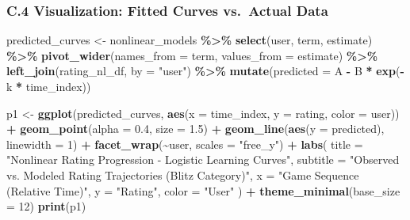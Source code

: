 \documentclass[
]{article}
\newenvironment{Shaded}{\begin{snugshade}}{\end{snugshade}}
\newcommand{\AttributeTok}[1]{\textcolor[rgb]{0.13,0.29,0.53}{#1}}
\newcommand{\DecValTok}[1]{\textcolor[rgb]{0.00,0.00,0.81}{#1}}
\newcommand{\FloatTok}[1]{\textcolor[rgb]{0.00,0.00,0.81}{#1}}
\newcommand{\FunctionTok}[1]{\textcolor[rgb]{0.13,0.29,0.53}{\textbf{#1}}}
\newcommand{\NormalTok}[1]{#1}
\newcommand{\OtherTok}[1]{\textcolor[rgb]{0.56,0.35,0.01}{#1}}
\newcommand{\SpecialCharTok}[1]{\textcolor[rgb]{0.81,0.36,0.00}{\textbf{#1}}}
\newcommand{\StringTok}[1]{\textcolor[rgb]{0.31,0.60,0.02}{#1}}
\begin{document}
\subsubsection{C.4 Visualization: Fitted Curves vs.~Actual
Data}\label{c.4-visualization-fitted-curves-vs.-actual-data}

\begin{Shaded}
\begin{Highlighting}[]
\NormalTok{predicted\_curves }\OtherTok{\textless{}{-}}\NormalTok{ nonlinear\_models }\SpecialCharTok{\%\textgreater{}\%}
  \FunctionTok{select}\NormalTok{(user, term, estimate) }\SpecialCharTok{\%\textgreater{}\%}
  \FunctionTok{pivot\_wider}\NormalTok{(}\AttributeTok{names\_from =}\NormalTok{ term, }\AttributeTok{values\_from =}\NormalTok{ estimate) }\SpecialCharTok{\%\textgreater{}\%}
  \FunctionTok{left\_join}\NormalTok{(rating\_nl\_df, }\AttributeTok{by =} \StringTok{"user"}\NormalTok{) }\SpecialCharTok{\%\textgreater{}\%}
  \FunctionTok{mutate}\NormalTok{(}\AttributeTok{predicted =}\NormalTok{ A }\SpecialCharTok{{-}}\NormalTok{ B }\SpecialCharTok{*} \FunctionTok{exp}\NormalTok{(}\SpecialCharTok{{-}}\NormalTok{k }\SpecialCharTok{*}\NormalTok{ time\_index))}

\NormalTok{p1 }\OtherTok{\textless{}{-}} \FunctionTok{ggplot}\NormalTok{(predicted\_curves, }\FunctionTok{aes}\NormalTok{(}\AttributeTok{x =}\NormalTok{ time\_index, }\AttributeTok{y =}\NormalTok{ rating, }\AttributeTok{color =}\NormalTok{ user)) }\SpecialCharTok{+}
  \FunctionTok{geom\_point}\NormalTok{(}\AttributeTok{alpha =} \FloatTok{0.4}\NormalTok{, }\AttributeTok{size =} \FloatTok{1.5}\NormalTok{) }\SpecialCharTok{+}
  \FunctionTok{geom\_line}\NormalTok{(}\FunctionTok{aes}\NormalTok{(}\AttributeTok{y =}\NormalTok{ predicted), }\AttributeTok{linewidth =} \DecValTok{1}\NormalTok{) }\SpecialCharTok{+}
  \FunctionTok{facet\_wrap}\NormalTok{(}\SpecialCharTok{\textasciitilde{}}\NormalTok{user, }\AttributeTok{scales =} \StringTok{"free\_y"}\NormalTok{) }\SpecialCharTok{+}
  \FunctionTok{labs}\NormalTok{(}
    \AttributeTok{title =} \StringTok{"Nonlinear Rating Progression {-} Logistic Learning Curves"}\NormalTok{,}
    \AttributeTok{subtitle =} \StringTok{"Observed vs. Modeled Rating Trajectories (Blitz Category)"}\NormalTok{,}
    \AttributeTok{x =} \StringTok{"Game Sequence (Relative Time)"}\NormalTok{,}
    \AttributeTok{y =} \StringTok{"Rating"}\NormalTok{,}
    \AttributeTok{color =} \StringTok{"User"}
\NormalTok{  ) }\SpecialCharTok{+}
  \FunctionTok{theme\_minimal}\NormalTok{(}\AttributeTok{base\_size =} \DecValTok{12}\NormalTok{)}
\FunctionTok{print}\NormalTok{(p1)}
\end{Highlighting}
\end{Shaded}
\end{document}
